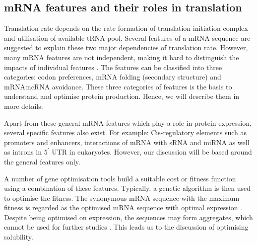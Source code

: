\subsection{mRNA features and their roles in translation}
Translation rate depends on the rate formation of translation initiation complex and utilisation of available tRNA pool. Several features of a mRNA sequence are suggested to explain these two major dependencies of translation rate. However, many mRNA features are not independent, making it hard to distinguish the impacts of individual features \cite{mauger2019mrna}. The features can be classified into three categories: codon preferences, mRNA folding (secondary structure) and mRNA:ncRNA avoidance. These three categories of features is the basis to understand and optimise protein production. Hence, we will describe them in more details:











Apart from these general mRNA features which play a role in protein expression, several specific features also exist. For example: Cis-regulatory elements such as promoters and enhancers, interactions of mRNA with sRNA and miRNA as well as introns in $5^{\prime}$ UTR in eukaryotes. However, our discussion will be based around the general features only. 


A number of gene optimisation tools build a suitable cost or fitness function using a combination of these features. Typically, a genetic algorithm is then used to optimise the fitness. The synonymous mRNA sequence with the maximum fitness is regarded as the optimised mRNA sequence with optimal expression \cite{Villalobos2006-nx, Salis2009-dh, Raab2010-eg, Chung2012-zh, Terai2016-vp}. Despite being optimised on expression, the sequences may form aggregates, which cannot be used for further studies \cite{gustafsson2004codon, rosano2009rare}. This leads us to the discussion of optimising solubility. 
